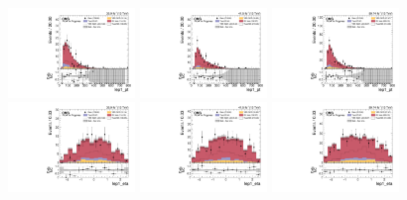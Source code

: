 \begin{figure}[!ht]
  \centering
  \includegraphics[width=0.30\textwidth]{analysis_plots/2016_zv/cr_vjets_e/lep1_pt.pdf}
  \includegraphics[width=0.30\textwidth]{analysis_plots/2017_zv/cr_vjets_e/lep1_pt.pdf}
  \includegraphics[width=0.30\textwidth]{analysis_plots/2018_zv/cr_vjets_e/lep1_pt.pdf} \\
  \includegraphics[width=0.30\textwidth]{analysis_plots/2016_zv/cr_vjets_e/lep1_eta.pdf}
  \includegraphics[width=0.30\textwidth]{analysis_plots/2017_zv/cr_vjets_e/lep1_eta.pdf}
  \includegraphics[width=0.30\textwidth]{analysis_plots/2018_zv/cr_vjets_e/lep1_eta.pdf} \\

\end{figure}
